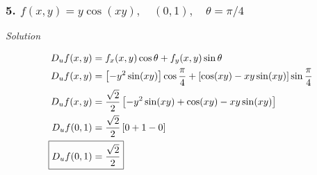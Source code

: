 \documentclass{article}
\newcommand{\solution}{\centerline{\textit{Solution}}}
\newcommand{\bb}[1]{\left[#1\right]}
\begin{document}
\subsubsection*{5. $f(x,y)=y\cos(xy),\quad(0,1),\quad \theta=\pi / 4$}
\solution 
\begin{align*}
    D_u f(x,y) &= f_x(x,y) \cos\theta + f_y(x,y) \sin\theta \\
    D_u f(x,y) &= \bb{-y^2\sin(xy)}\cos\frac \pi 4 + \bb{\cos(xy) -
    xy\sin(xy)}\sin\frac \pi 4 \\
    D_u f(x,y) &= \displaystyle\frac{\sqrt 2}{2}\bb{-y^2\sin(xy) +
    \cos(xy)-xy\sin(xy)} \\
    D_u f(0,1) &= \displaystyle\frac{\sqrt 2 }{2} \bb{0 + 1 - 0} \\
    \Aboxed{D_u f(0,1) &= \displaystyle\frac{\sqrt 2}{2}}
\end{align*}
\end{document}
